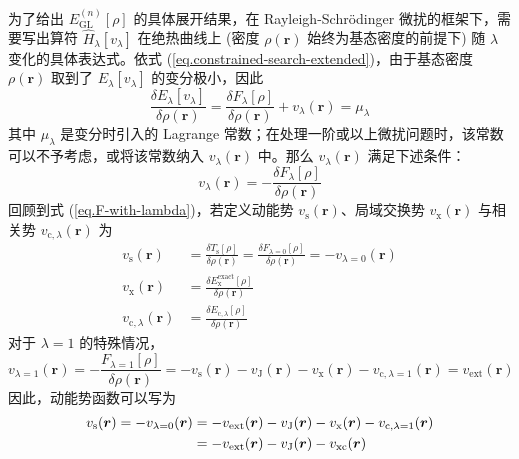 为了给出 $E_\mathrm{GL}^{(n)} [\rho]$ 的具体展开结果，在 Rayleigh-Schr\"odinger 微扰的框架下，需要写出算符 $\hat H_\lambda [v_\lambda]$ 在绝热曲线上 (密度 $\rho(\bm{r})$ 始终为基态密度的前提下) 随 $\lambda$ 变化的具体表达式。依式 (\ref{eq.constrained-search-extended})，由于基态密度 $\rho(\bm{r})$ 取到了 $E_\lambda[v_\lambda]$ 的变分极小，因此
\begin{equation*}
  \frac{\delta E_\lambda[v_\lambda]}{\delta \rho(\bm{r})} = \frac{\delta F_\lambda [\rho]}{\delta \rho(\bm{r})} + v_{\lambda}(\bm{r}) = \mu_\lambda
\end{equation*}
其中 $\mu_\lambda$ 是变分时引入的 Lagrange 常数；在处理一阶或以上微扰问题时，该常数可以不予考虑，或将该常数纳入 $v_\lambda(\bm{r})$ 中。那么 $v_\lambda(\bm{r})$ 满足下述条件：
\begin{equation}
  v_\lambda(\bm{r}) = - \frac{\delta F_\lambda [\rho]}{\delta \rho(\bm{r})}
\end{equation}
回顾到式 (\ref{eq.F-with-lambda})，若定义动能势 $v_\mathrm{s} (\bm{r})$、局域交换势 $v_\mathrm{x} (\bm{r})$ 与相关势 $v_{\mathrm{c}, \lambda} (\bm{r})$ 为
\begin{align}
  v_\mathrm{s}(\bm{r}) &= \frac{\delta T_\mathrm{s} [\rho]}{\delta \rho(\bm{r})} = \frac{\delta F_{\lambda=0} [\rho]}{\delta \rho(\bm{r})} = - v_{\lambda=0}(\bm{r}) \\
  \label{eq.v-x}
  v_\mathrm{x} (\bm{r}) &= \frac{\delta E_\mathrm{x}^\mathrm{exact} [\rho]}{\delta \rho(\bm{r})} \\
  \label{eq.v-c-lambda}
  v_{\mathrm{c}, \lambda} (\bm{r}) &= \frac{\delta E_{\mathrm{c}, \lambda} [\rho]}{\delta \rho(\bm{r})}
\end{align}
对于 $\lambda = 1$ 的特殊情况，
\begin{equation}
  v_{\lambda=1}(\bm{r}) = - \frac{F_{\lambda=1} [\rho]}{\delta \rho(\bm{r})} = - v_\mathrm{s}(\bm{r}) - v_\mathrm{J}(\bm{r}) - v_\mathrm{x}(\bm{r}) - v_{\mathrm{c}, \lambda=1}(\bm{r}) = v_\mathrm{ext}(\bm{r})
\end{equation}
因此，动能势函数可以写为
\begin{align}
  v_\mathrm{s}(\bm{r}) = - v_{\lambda=0} (\bm{r}) &= - v_\mathrm{ext}(\bm{r}) - v_\mathrm{J}(\bm{r}) - v_\mathrm{x}(\bm{r}) - v_{\mathrm{c}, \lambda=1}(\bm{r}) \notag\\
  &= - v_\mathrm{ext}(\bm{r}) - v_\mathrm{J}(\bm{r}) - v_\mathrm{xc}(\bm{r})
\end{align}

